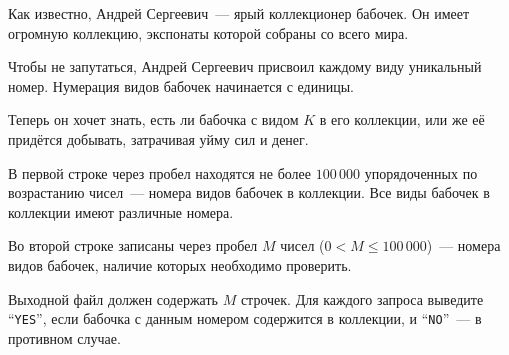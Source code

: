 Как известно, Андрей Сергеевич~--- ярый коллекционер бабочек.
Он имеет огромную коллекцию, экспонаты которой собраны со всего мира.

Чтобы не запутаться, Андрей Сергеевич присвоил каждому виду уникальный номер.
Нумерация видов бабочек начинается с единицы.

Теперь он хочет знать, есть ли бабочка с видом $K$ в его коллекции, или же её придётся добывать, затрачивая уйму сил и денег.

\InputFile
В первой строке через пробел находятся не более $100\,000$ упорядоченных по возрастанию чисел~--- номера видов бабочек в коллекции. Все виды бабочек в коллекции имеют различные номера.

Во второй строке записаны через пробел $M$ чисел ($0 < M \le 100\,000$)~--- номера видов бабочек, наличие которых 
необходимо проверить.

\OutputFile
Выходной файл должен содержать $M$ строчек. Для каждого запроса выведите ``\texttt{YES}'', если бабочка с данным номером содержится в коллекции, и ``\texttt{NO}''~--- в противном случае.

